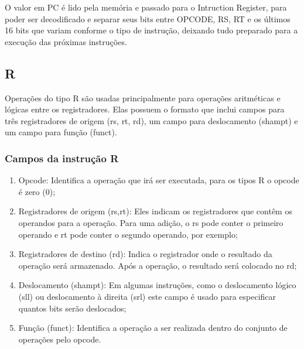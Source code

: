 O valor em PC é lido pela memória e passado para o Intruction Register, para poder ser decodificado e separar seus bits entre OPCODE, RS, RT e os últimos 16 bits que variam conforme o tipo de instrução, deixando tudo preparado para a execução das próximas instruções.


\newpage

 \subsection{R}
 
Operações do tipo R são usadas principalmente para operações aritméticas e lógicas entre os registradores. Elas possuem o formato que inclui campos para três registradores de origem (rs, rt, rd), um campo para deslocamento (shampt) e um campo para função (funct).

 \subsubsection{Campos da instrução R}

 \begin{enumerate}
    \item Opcode: Identifica a operação que irá ser executada, para os tipos R o opcode é zero (0);
    \item Registradores de origem (rs,rt): Eles indicam os registradores que contêm os operandos para a operação. Para uma adição, o rs pode conter o primeiro operando e rt pode conter o segundo operando, por exemplo;
    \item Registradores de destino (rd): Indica o registrador onde o resultado da operação será armazenado. Após a operação, o resultado será colocado no rd;
    \item Deslocamento (shampt): Em algumas instruções, como o deslocamento lógico (sll) ou deslocamento à direita (srl) este campo é usado para especificar quantos bits serão deslocados;
    \item Função (funct): Identifica a operação a ser realizada dentro do conjunto de operações pelo opcode.
\end{enumerate}

